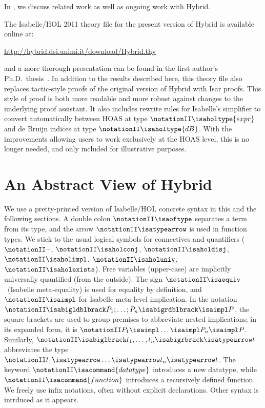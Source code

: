 \documentclass[copyright,creativecommons]{eptcs}
\begin{document}
In , we discuss related work as well as
ongoing work with Hybrid.

The Isabelle/HOL 2011 theory file for the present version of Hybrid is
available online at:
\begin{center}
\url{http://hybrid.dsi.unimi.it/download/Hybrid.thy}
\end{center}
and a more thorough presentation can be found in the first author's
Ph.D.\ thesis~\cite{martin:2010a,martin:2010b}.
In addition to the results described here, this theory file also
replaces tactic-style proofs of the original version of Hybrid with
Isar proofs.  This style of proof is both more readable and more
robust against changes to the underlying proof assistant.  It also
includes rewrite rules for Isabelle's simplifier to convert
automatically between HOAS at type \(\notationII \isaholtype{expr}\) and de Bruijn indices at
type \(\notationII \isaholtype{dB}\).  With the improvements allowing users to work
exclusively at the HOAS level, this is no longer needed, and only
included for illustrative purposes.


\section{An Abstract View of Hybrid}
\label{sec:hybrid-overview}

We use a pretty-printed version of Isabelle\slash HOL concrete syntax
in this and the following sections.
A double colon \(\notationII  \isaoftype \) separates a term from its type, and the arrow
\(\notationII  \isatypearrow \) is used in function types.
We stick to the usual logical symbols for connectives and quantifiers
(\(\notationII  \neg \), \(\notationII  \isaholconj \), \(\notationII  \isaholdisj \), \(\notationII  \isaholimpl \), \(\notationII   \isaholuniv \), \(\notationII   \isaholexists \)).
Free variables (upper-case) are implicitly universally quantified
(from the outside).
The sign \(\notationII  \isaequiv \)\ (Isabelle meta-equality) is used for equality by
definition, and \(\notationII  \isaimpl \) for Isabelle meta-level implication.
In the notation \(\notationII  \isabigldblbrack P_1; \ldots; P_n \isabigrdblbrack \isaimpl P \), the square
brackets are used to group premises to abbreviate nested implications;
in its expanded form, it is \(\notationII  P_1 \isaimpl \dots \isaimpl P_n \isaimpl P \).
Similarly, \(\notationII  \isabiglbrack t_1, \ldots, t_n \isabigrbrack \isatypearrow t \) abbreviates the type
\(\notationII  t_1 \isatypearrow \dots \isatypearrow t_n \isatypearrow t \).
The keyword \(\notationII  \isacommand{datatype} \) introduces a new datatype, while
\(\notationII  \isacommand{function} \) introduces a recursively defined function.
We freely use infix notations, often without explicit declarations.
Other syntax is intrduced as it appears.
\end{document}
